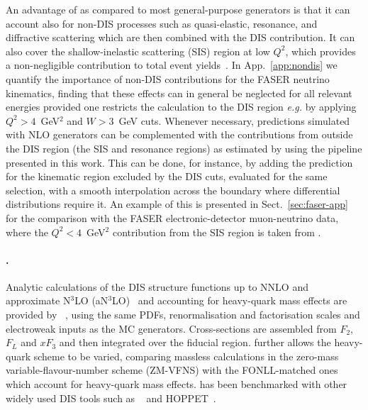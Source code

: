 An advantage of \genie as compared to most general-purpose generators is that it can account also for non-DIS processes such as quasi-elastic, resonance, and diffractive scattering which are then combined with the DIS contribution.
%
It can also cover the shallow-inelastic scattering (SIS) region at low $Q^2$, which provides a non-negligible contribution to total event yields~\cite{Candido:2023utz}.
%
In App.~\ref{app:nondis} we quantify the importance of non-DIS contributions for the FASER neutrino kinematics, finding that these effects can in general be neglected for all relevant energies provided one restricts the calculation to the DIS region {\it e.g.} by applying $Q^2>4$~GeV$^2$ and $W>3$~GeV cuts. 
%
Whenever necessary, predictions simulated with NLO generators can be complemented with the contributions from outside the DIS region (the SIS and resonance regions) as estimated by \genie using the pipeline presented in this work.
%
This can be done, for instance, by adding the \genie prediction for the kinematic region excluded by the DIS cuts, evaluated for the same selection, with a smooth interpolation across the boundary where differential distributions require it.
%
An example of this is presented in Sect.~\ref{sec:faser-app} for the comparison with the FASER electronic-detector muon-neutrino data, where the $Q^2<4$~GeV$^2$ contribution from the SIS region is taken from \genie.

\paragraph{\yadism.} Analytic calculations of the DIS structure functions up to NNLO and approximate N$^3$LO (aN$^3$LO)~\cite{NNPDF:2024nan} and accounting for heavy-quark mass effects are provided by
\yadism~\cite{Candido:2024rkr}, using the same PDFs, renormalisation and factorisation scales and electroweak inputs as the MC generators. 
%
Cross-sections are assembled from $F_2$, $F_L$ and $xF_3$ and then integrated over the
fiducial region.
%
\yadism further allows the heavy-quark scheme to be varied, comparing massless calculations in the zero-mass variable-flavour-number scheme (ZM-VFNS) with the FONLL-matched ones~\cite{Forte:2010ta} which account for heavy-quark mass effects.
%
\yadism has been benchmarked with other widely used DIS tools such as \apfel~\cite{Bertone:2013vaa} and {\sc\small HOPPET}~\cite{Salam:2008qg,Karlberg:2025hxk}.